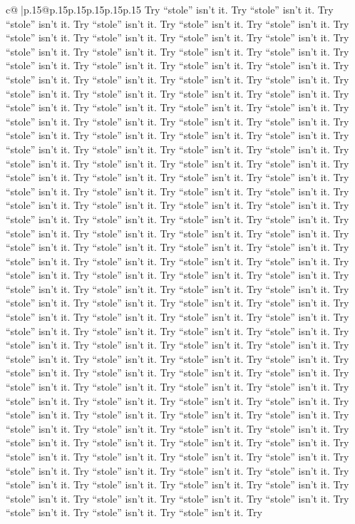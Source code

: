 \documentclass{article}
\begin{document}
{\begin{supertabular}{c@{$\;$}|p{.15\linewidth}@{}p{.15\linewidth}p{.15\linewidth}p{.15\linewidth}p{.15\linewidth}p{.15\linewidth}}
{{{Try “stole” isn’t it. Try “stole” isn’t it. Try “stole” isn’t it. Try “stole” isn’t it. Try “stole” isn’t it. Try “stole” isn’t it. Try “stole” isn’t it. Try “stole” isn’t it. Try “stole” isn’t it. Try “stole” isn’t it. Try “stole” isn’t it. Try “stole” isn’t it. Try “stole” isn’t it. Try “stole” isn’t it. Try “stole” isn’t it. Try “stole” isn’t it. Try “stole” isn’t it. Try “stole” isn’t it. Try “stole” isn’t it. Try “stole” isn’t it. Try “stole” isn’t it. Try “stole” isn’t it. Try “stole” isn’t it. Try “stole” isn’t it. Try “stole” isn’t it. Try “stole” isn’t it. Try “stole” isn’t it. Try “stole” isn’t it. Try “stole” isn’t it. Try “stole” isn’t it. Try “stole” isn’t it. Try “stole” isn’t it. Try “stole” isn’t it. Try “stole” isn’t it. Try “stole” isn’t it. Try “stole” isn’t it. Try “stole” isn’t it. Try “stole” isn’t it. Try “stole” isn’t it. Try “stole” isn’t it. Try “stole” isn’t it. Try “stole” isn’t it. Try “stole” isn’t it. Try “stole” isn’t it. Try “stole” isn’t it. Try “stole” isn’t it. Try “stole” isn’t it. Try “stole” isn’t it. Try “stole” isn’t it. Try “stole” isn’t it. Try “stole” isn’t it. Try “stole” isn’t it. Try “stole” isn’t it. Try “stole” isn’t it. Try “stole” isn’t it. Try “stole” isn’t it. Try “stole” isn’t it. Try “stole” isn’t it. Try “stole” isn’t it. Try “stole” isn’t it. Try “stole” isn’t it. Try “stole” isn’t it. Try “stole” isn’t it. Try “stole” isn’t it. Try “stole” isn’t it. Try “stole” isn’t it. Try “stole” isn’t it. Try “stole” isn’t it. Try “stole” isn’t it. Try “stole” isn’t it. Try “stole” isn’t it. Try “stole” isn’t it. Try “stole” isn’t it. Try “stole” isn’t it. Try “stole” isn’t it. Try “stole” isn’t it. Try “stole” isn’t it. Try “stole” isn’t it. Try “stole” isn’t it. Try “stole” isn’t it. Try “stole” isn’t it. Try “stole” isn’t it. Try “stole” isn’t it. Try “stole” isn’t it. Try “stole” isn’t it. Try “stole” isn’t it. Try “stole” isn’t it. Try “stole” isn’t it. Try “stole” isn’t it. Try “stole” isn’t it. Try “stole” isn’t it. Try “stole” isn’t it. Try “stole” isn’t it. Try “stole” isn’t it. Try “stole” isn’t it. Try “stole” isn’t it. Try “stole” isn’t it. Try “stole” isn’t it. Try “stole” isn’t it. Try “stole” isn’t it. Try “stole” isn’t it. Try “stole” isn’t it. Try “stole” isn’t it. Try “stole” isn’t it. Try “stole” isn’t it. Try “stole” isn’t it. Try “stole” isn’t it. Try “stole” isn’t it. Try “stole” isn’t it. Try “stole” isn’t it. Try “stole” isn’t it. Try “stole” isn’t it. Try “stole” isn’t it. Try “stole” isn’t it. Try “stole” isn’t it. Try “stole” isn’t it. Try “stole” isn’t it. Try “stole” isn’t it. Try “stole” isn’t it. Try “stole” isn’t it. Try “stole” isn’t it. Try “stole” isn’t it. Try “stole” isn’t it. Try “stole” isn’t it. Try “stole” isn’t it. Try “stole” isn’t it. Try “stole” isn’t it. Try “stole” isn’t it. Try “stole” isn’t it. Try “stole” isn’t it. Try “stole” isn’t it. Try “stole” isn’t it. Try “stole” isn’t it. Try “stole” isn’t it. Try “stole” isn’t it. Try “stole” isn’t it. Try “stole” isn’t it. Try “stole” isn’t it. Try “stole” isn’t it. Try “stole” isn’t it. Try “stole” isn’t it. Try “stole” isn’t it. Try “stole” isn’t it. Try “stole” isn’t it. Try “stole” isn’t it. Try }}}
\end{supertabular}}
\end{document}
